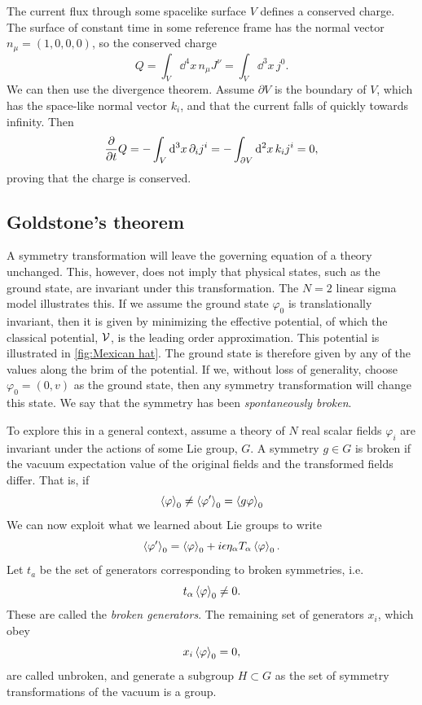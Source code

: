 The current flux through some spacelike surface $V$ defines a conserved charge. The surface of constant time in some reference frame has the normal vector $n_\mu = (1, 0, 0, 0)$, so the conserved charge
\begin{equation}
    Q = \int_V \dd^4 x \, n_\mu J^\nu = \int_V \dd^3 x \, j^0.
\end{equation}
We can then use the divergence theorem.
Assume $\partial V$ is the boundary of $V$, which has the space-like normal vector $k_i$, and that the current falls of quickly towards infinity.
Then
\begin{equation}
    \pdv{t} Q = - \int_V \dd^3 x \, \partial_i j^i = - \int_{\partial V} \dd^2 x\, k_i j^i = 0,
\end{equation}
proving that the charge is conserved.

\subsection*{Goldstone's theorem}

A symmetry transformation will leave the governing equation of a theory unchanged.
This, however, does not imply that physical states, such as the ground state, are invariant under this transformation.
The $N = 2$ linear sigma model illustrates this.
If we assume the ground state $\varphi_{0}$ is translationally invariant, then it is given by minimizing the effective potential, of which the classical potential, $\mathcal{V}$, is the leading order approximation.
This potential is illustrated in \autoref{fig:Mexican hat}.
The ground state is therefore given by any of the values along the brim of the potential.
If we, without loss of generality, choose $\varphi_0 = (0, v)$ as the ground state, then any symmetry transformation will change this state.
We say that the symmetry has been \emph{spontaneously broken}.

To explore this in a general context, assume a theory of $N$ real scalar fields $\varphi_i$ are invariant under the actions of some Lie group, $G$.
A symmetry $g \in G$ is broken if the vacuum expectation value of the original fields and the transformed fields differ.
That is, if
\begin{equation}
    \ex{\varphi}_0 \neq \ex{\varphi'}_0 = \ex{g \varphi}_0
\end{equation}
We can now exploit what we learned about Lie groups to write
\begin{equation}
    \ex{\varphi'}_0 = \ex{\varphi}_0 + i \epsilon \eta_\alpha T_\alpha \ex{\varphi}_0.
\end{equation}
Let $t_a$ be the set of generators corresponding to broken symmetries, i.e.
\begin{equation}
    t_\alpha \ex{\varphi}_0 \neq 0.
\end{equation}
These are called the \emph{broken generators}.
The remaining set of generators $x_i$, which obey
\begin{equation}
    x_i \ex{\varphi}_0 = 0,
\end{equation}
are called unbroken, and generate a subgroup $H \subset G$ as the set of symmetry transformations of the vacuum is a group.

